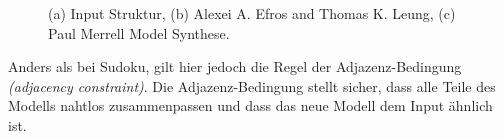 \documentclass[12pt, a4paper,twoside,openright]{report} %
\begin{document}
\begin{figure}[H]
    \centering
    \qquad
    \qquad
    \caption{(a) Input Struktur, (b) Alexei A. Efros and Thomas K. Leung, (c) Paul Merrell Model Synthese. \cite{merrell2009model}}%
\end{figure}

Anders als bei Sudoku, gilt hier jedoch die Regel der Adjazenz-Bedingung \textit{(adjacency constraint)}.
Die Adjazenz-Bedingung stellt sicher, dass alle Teile des Modells nahtlos zusammenpassen und dass das neue Modell dem Input ähnlich ist.
\end{document}
